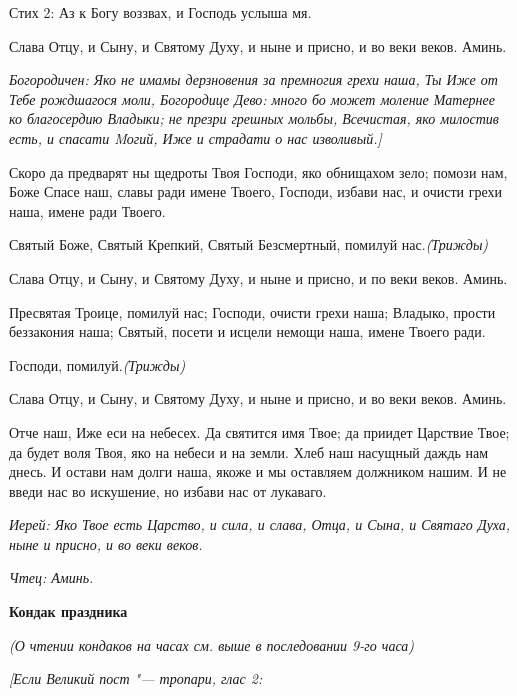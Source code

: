 Стих 2: Аз к Богу воззвах, и Господь услыша мя.



Слава Отцу, и Сыну, и Святому Духу, и ныне и присно, и во веки веков. Аминь.

\itshape Богородиче\normalfont{}н: Яко не имамы дерзновения за премногия грехи наша, Ты Иже от Тебе рождшагося моли, Богородице Дево: много бо может моление Матернее ко благосердию Владыки; не презри грешных мольбы, Всечистая, яко милостив есть, и спасати Mогий, Иже и страдати о нас изволивый.]





Скоро да предварят ны щедроты Твоя Господи, яко обнищахом зело; помози нам, Боже Спасе наш, славы ради имене Твоего, Господи, избави нас, и очисти грехи наша, имене ради Твоего.



Святый Боже, Святый Крепкий, Святый Безсмертный, помилуй нас.\itshape  (Трижды)

\normalfont{}Слава Отцу, и Сыну, и Святому Духу, и ныне и присно, и по веки веков. Аминь.



Пресвятая Троице, помилуй нас; Господи, очисти грехи наша; Владыко, прости беззакония наша; Святый, посети и исцели немощи наша, имене Твоего ради.



Господи, помилуй.\itshape  (Трижды)

\normalfont{}Слава Отцу, и Сыну, и Святому Духу, и ныне и присно, и во веки веков. Аминь.

Отче наш, Иже еси на небесех. Да святится имя Твое; да приидет Царствие Твое; да будет воля Твоя, яко на небеси и на земли. Хлеб наш насущный даждь нам днесь. И остави нам долги наша, якоже и мы оставляем должником нашим. И не введи нас во искушение, но избави нас от лукаваго.

\itshape Иерей\normalfont{}: Яко Твое есть Царство, и сила, и слава, Отца, и Сына, и Святаго Духа, ныне и присно, и во веки веков.

\itshape Чтец\normalfont{}: Аминь.


\medskip
\bfseries Кондак праздника\normalfont{}\nopagebreak

\itshape (О чтении кондаков на часах см. выше в последовании 9-го час\normalfont{}а)



\itshape [Если Великий пост "--- тропари, глас \normalfont{}2:

